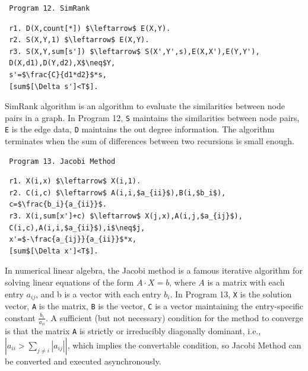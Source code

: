\begin{appendix}
 \begin{verbatim}
 Program 12. SimRank
 \end{verbatim}\small
 \begin{lstlisting}
 r1. D(X,count[*]) $\leftarrow$ E(X,Y).
 r2. S(X,Y,1) $\leftarrow$ E(X,Y).
 r3. S(X,Y,sum[s']) $\leftarrow$ S(X',Y',s),E(X,X'),E(Y,Y'),
 D(X,d1),D(Y,d2),X$\neq$Y,
 s'=$\frac{C}{d1*d2}$*s,
 [sum$[\Delta s']<T$].
 \end{lstlisting}
 \normalsize
 
 SimRank algorithm \cite{Jeh:2002:SMS:775047.775126} is an algorithm to evaluate the similarities between node pairs in a graph. In Program 12, \texttt{S} maintains the similarities between node pairs, \texttt{E} is the edge data, \texttt{D} maintains the out degree information. The algorithm terminates when the sum of differences between two recursions is small enough.
 
 \begin{verbatim}
 Program 13. Jacobi Method
 \end{verbatim}\small
 \begin{lstlisting}
 r1. X(i,x) $\leftarrow$ X(i,1).
 r2. C(i,c) $\leftarrow$ A(i,i,$a_{ii}$),B(i,$b_i$),
 c=$\frac{b_i}{a_{ii}}$.
 r3. X(i,sum[x']+c) $\leftarrow$ X(j,x),A(i,j,$a_{ij}$),
 C(i,c),A(i,i,$a_{ii}$),i$\neq$j,
 x'=$-\frac{a_{ij}}{a_{ii}}$*x,
 [sum$[\Delta x']<T$].
 \end{lstlisting}
 \normalsize
 
 In numerical linear algebra, the Jacobi method is a famous iterative algorithm for solving linear equations of the form $A\cdot X=b$, where $A$ is a matrix with each entry $a_{ij}$, and b is a vector with each entry $b_i$. In Program 13, \texttt{X} is the solution vector, \texttt{A} is the matrix, \texttt{B} is the vector, \texttt{C} is a vector maintaining the entry-specific constant $\frac{b_i}{a_{ii}}$. A sufficient (but not necessary) condition for the method to converge is that the matrix \texttt{A} is strictly or irreducibly diagonally dominant, i.e., $|a_{ii}>\sum_{j\neq i}{|a_{ij}|}|$, which implies the convertable condition, so Jacobi Method can be converted and executed asynchronously.
 
  

\end{appendix}
